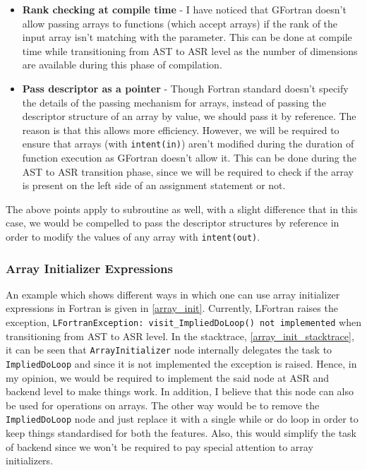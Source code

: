 

\begin{itemize}

\item \textbf{Rank checking at compile time} - I have noticed that GFortran doesn't allow passing arrays to functions (which accept arrays) if the rank of the input array isn't matching with the parameter. This can be done at compile time while transitioning from AST to ASR level as the number of dimensions are available during this phase of compilation.

\item \textbf{Pass descriptor as a pointer} - Though Fortran standard doesn't specify the details of the passing mechanism for arrays, instead of passing the descriptor structure of an array by value, we should pass it by reference. The reason is that this allows more efficiency. However, we will be required to ensure that arrays (with \texttt{intent(in)}) aren't modified during the duration of function execution as GFortran doesn't allow it. This can be done during the AST to ASR transition phase, since we will be required to check if the array is present on the left side of an assignment statement or not.

\end{itemize}

The above points apply to subroutine as well, with a slight difference that in this case, we would be compelled to pass the descriptor structures by reference in order to modify the values of any array with \texttt{intent(out)}.

\subsubsection{Array Initializer Expressions}

An example which shows different ways in which one can use array initializer expressions in Fortran is given in \ref{array_init}. Currently, LFortran raises the exception, \texttt{LFortranException: visit\_ImpliedDoLoop() not implemented} when transitioning from AST to ASR level. In the stacktrace, \ref{array_init_stacktrace}, it can be seen that \texttt{ArrayInitializer} node internally delegates the task to \texttt{ImpliedDoLoop} and since it is not implemented the exception is raised. Hence, in my opinion, we would be required to implement the said node at ASR and backend level to make things work. In addition, I believe that this node can also be used for operations on arrays. The other way would be to remove the \texttt{ImpliedDoLoop} node and just replace it with a single while or do loop in order to keep things standardised for both the features. Also, this would simplify the task of backend since we won't be required to pay special attention to array initializers.

